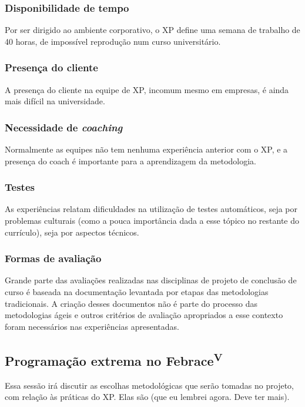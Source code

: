 \documentclass[a4paper,12pt,font=plain,header=plain]{abnt}
\begin{document}
      \subsubsection{Disponibilidade de tempo}
        Por ser dirigido ao ambiente corporativo, o XP define uma semana de trabalho de 40 horas, de impossível reprodução num curso universitário.

      \subsubsection{Presença do cliente}
        A presença do cliente na equipe de XP, incomum mesmo em empresas, é ainda mais difícil na universidade.

      \subsubsection{Necessidade de \textit{coaching}}
        Normalmente as equipes não tem nenhuma experiência anterior com o XP, e a presença do coach é importante para a aprendizagem da metodologia.

      \subsubsection{Testes}
        As experiências relatam dificuldades na utilização de testes automáticos, seja por problemas culturais (como a pouca importância dada a esse tópico no restante do currículo), seja por aspectos técnicos.

      \subsubsection{Formas de avaliação}
        Grande parte das avaliações realizadas nas disciplinas de projeto de conclusão de curso é baseada na documentação levantada por etapas das metodologias tradicionais. A criação desses documentos não é parte do processo das metodologias ágeis e outros critérios de avaliação apropriados a esse contexto foram necessários nas experiências apresentadas.

    \subsection{Programação extrema no Febrace\textsuperscript{V}}
      Essa sessão irá discutir as escolhas metodológicas que serão tomadas no projeto, com relação às práticas do XP. Elas são (que eu lembrei agora. Deve ter mais).
\end{document}
